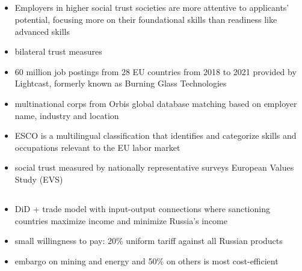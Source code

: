 \documentclass[10pt]{article} %
\begin{document}
    \subsection{\cite{ZhangWang2023}}
    \begin{itemize}
        \item Employers in higher social trust societies are more attentive to applicants' potential, focusing more on their foundational skills than readiness like advanced skills
        \item bilateral trust measures
        \item 60 million job postings from 28 EU countries from 2018 to 2021 provided by Lightcast, formerly known as Burning Glass Technologies
        \item multinational corps from Orbis global database matching based on employer name, industry and location
        \item ESCO is a multilingual classification that identifies and categorize skills and occupations relevant to the EU labor market
        \item social trust measured by nationally representative surveys European Values Study (EVS)
    \end{itemize}

    \subsection{\cite{deSouzaetal2022}}
    \begin{itemize}
        \item DiD + trade model with input-output connections where sanctioning countries maximize income and minimize Russia's income
        \item small willingness to pay: 20\% uniform tariff against all Russian products
        \item embargo on mining and energy and 50\% on others is most cost-efficient
    \end{itemize}
\end{document}
